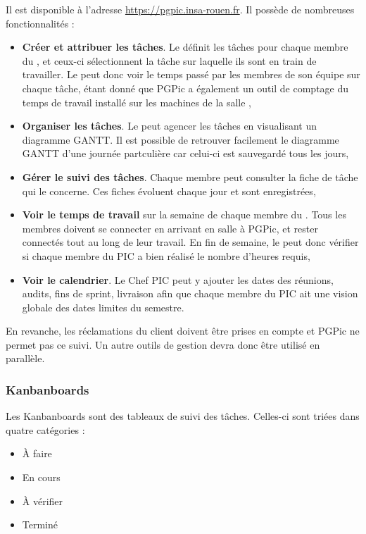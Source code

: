 Il est disponible à l’adresse \url{https://pgpic.insa-rouen.fr}. Il possède de nombreuses fonctionnalités : 
\begin{itemize}
\item \textbf{Créer et attribuer les tâches}. Le \CP{} définit les tâches pour chaque membre du \PICCourt, et ceux-ci sélectionnent la tâche sur laquelle ils sont en train de travailler. Le \CP{} peut donc voir le temps passé par les membres de son équipe sur chaque tâche, étant donné que PGPic a également un outil de comptage du temps de travail installé sur les machines de la salle \PICCourt ,
\item \textbf{Organiser les tâches}. Le \CP{} peut agencer les tâches en visualisant un diagramme GANTT. Il est possible de retrouver facilement le diagramme GANTT d'une journée partculière car celui-ci est sauvegardé tous les jours, 
\item \textbf{Gérer le suivi des tâches}. Chaque membre peut consulter la fiche de tâche qui le concerne. Ces fiches évoluent chaque jour et sont enregistrées,
\item \textbf{Voir le temps de travail} sur la semaine de chaque membre du \PICCourt. Tous les membres doivent se connecter en arrivant en salle \PICCourt à PGPic, et rester connectés tout au long de leur travail. En fin de semaine, le \CP{} peut donc vérifier si chaque membre du PIC a bien réalisé le nombre d’heures requis,
\item \textbf{Voir le calendrier}. Le Chef PIC peut y ajouter les dates des réunions, audits, fins de sprint, livraison afin que chaque membre du PIC ait une vision globale des dates limites du semestre. \\ 
\end{itemize}

En revanche, les réclamations du client doivent être prises en compte et PGPic ne permet pas ce suivi. Un autre outils de gestion devra donc être utilisé en parallèle. 


\subsubsection*{Kanbanboards} 

Les Kanbanboards sont des tableaux de suivi des tâches. Celles-ci sont triées dans quatre catégories :
\begin{itemize}
\item \`A faire
\item En cours
\item \`A vérifier
\item Terminé \\ 
\end{itemize}

